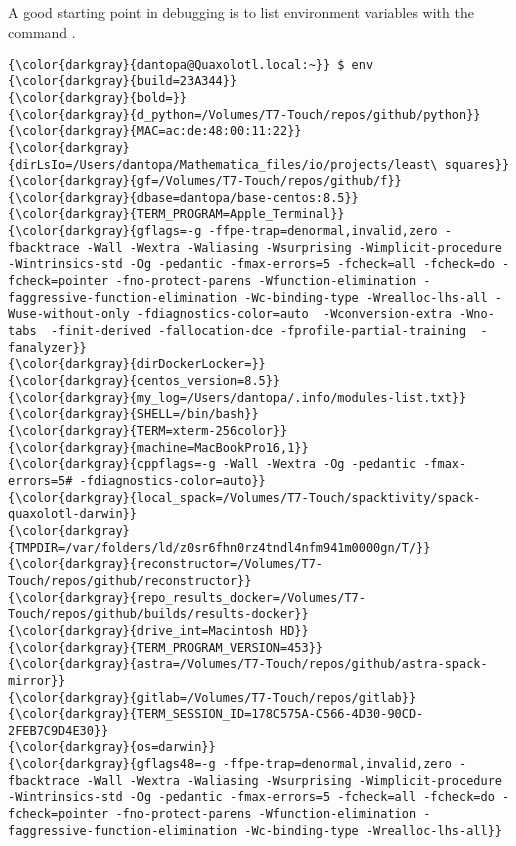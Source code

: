 % 

\subsection{\env}
\label{sec:env}
A good starting point in debugging is to list environment variables with the command .
{\footnotesize{
\begin{Verbatim}[commandchars=\\\{\}]
{\color{darkgray}{dantopa@Quaxolotl.local:~}} $ env
{\color{darkgray}{build=23A344}}
{\color{darkgray}{bold=}}
{\color{darkgray}{d_python=/Volumes/T7-Touch/repos/github/python}}
{\color{darkgray}{MAC=ac:de:48:00:11:22}}
{\color{darkgray}{dirLsIo=/Users/dantopa/Mathematica_files/io/projects/least\ squares}}
{\color{darkgray}{gf=/Volumes/T7-Touch/repos/github/f}}
{\color{darkgray}{dbase=dantopa/base-centos:8.5}}
{\color{darkgray}{TERM_PROGRAM=Apple_Terminal}}
{\color{darkgray}{gflags=-g -ffpe-trap=denormal,invalid,zero -fbacktrace -Wall -Wextra -Waliasing -Wsurprising -Wimplicit-procedure -Wintrinsics-std -Og -pedantic -fmax-errors=5 -fcheck=all -fcheck=do -fcheck=pointer -fno-protect-parens -Wfunction-elimination -faggressive-function-elimination -Wc-binding-type -Wrealloc-lhs-all -Wuse-without-only -fdiagnostics-color=auto  -Wconversion-extra -Wno-tabs  -finit-derived -fallocation-dce -fprofile-partial-training  -fanalyzer}}
{\color{darkgray}{dirDockerLocker=}}
{\color{darkgray}{centos_version=8.5}}
{\color{darkgray}{my_log=/Users/dantopa/.info/modules-list.txt}}
{\color{darkgray}{SHELL=/bin/bash}}
{\color{darkgray}{TERM=xterm-256color}}
{\color{darkgray}{machine=MacBookPro16,1}}
{\color{darkgray}{cppflags=-g -Wall -Wextra -Og -pedantic -fmax-errors=5# -fdiagnostics-color=auto}}
{\color{darkgray}{local_spack=/Volumes/T7-Touch/spacktivity/spack-quaxolotl-darwin}}
{\color{darkgray}{TMPDIR=/var/folders/ld/z0sr6fhn0rz4tndl4nfm941m0000gn/T/}}
{\color{darkgray}{reconstructor=/Volumes/T7-Touch/repos/github/reconstructor}}
{\color{darkgray}{repo_results_docker=/Volumes/T7-Touch/repos/github/builds/results-docker}}
{\color{darkgray}{drive_int=Macintosh HD}}
{\color{darkgray}{TERM_PROGRAM_VERSION=453}}
{\color{darkgray}{astra=/Volumes/T7-Touch/repos/github/astra-spack-mirror}}
{\color{darkgray}{gitlab=/Volumes/T7-Touch/repos/gitlab}}
{\color{darkgray}{TERM_SESSION_ID=178C575A-C566-4D30-90CD-2FEB7C9D4E30}}
{\color{darkgray}{os=darwin}}
{\color{darkgray}{gflags48=-g -ffpe-trap=denormal,invalid,zero -fbacktrace -Wall -Wextra -Waliasing -Wsurprising -Wimplicit-procedure -Wintrinsics-std -Og -pedantic -fmax-errors=5 -fcheck=all -fcheck=do -fcheck=pointer -fno-protect-parens -Wfunction-elimination -faggressive-function-elimination -Wc-binding-type -Wrealloc-lhs-all}}

\end{Verbatim}}}
